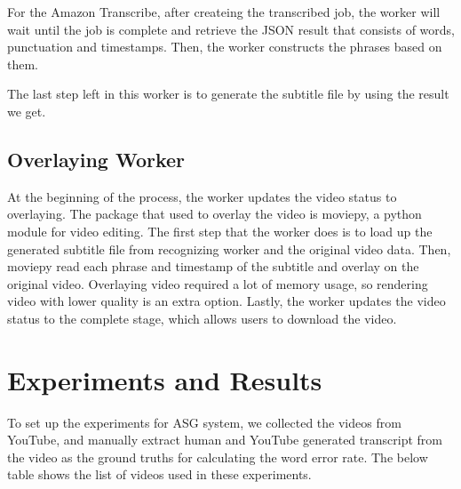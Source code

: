 \documentclass[natbib]{muthesis}
\begin{document}
 For the Amazon Transcribe, after createing the transcribed job, the worker will wait until the job is complete and retrieve the JSON result that consists of words, punctuation and timestamps. Then, the worker constructs the phrases based on them.
 
 The last step left in this worker is to generate the subtitle file by using the result we get.
 
 \section{Overlaying Worker}
 At the beginning of the process, the worker updates the video status to overlaying. The package that used to overlay the video is moviepy, a python module for video editing. The first step that the worker does is to load up the generated subtitle file from recognizing worker and the original video data. Then, moviepy read each phrase and timestamp of the subtitle and overlay on the original video. Overlaying video required a lot of memory usage, so rendering video with lower quality is an extra option. Lastly, the worker updates the video status to the complete stage, which allows users to download the video.
 
 \chapter{Experiments and Results}
 
 To set up the experiments for ASG system, we collected the videos from YouTube, and manually extract human and YouTube generated transcript from the video as the ground truths for calculating the word error rate. The below table shows the list of videos used in these experiments.
 
\end{document}
